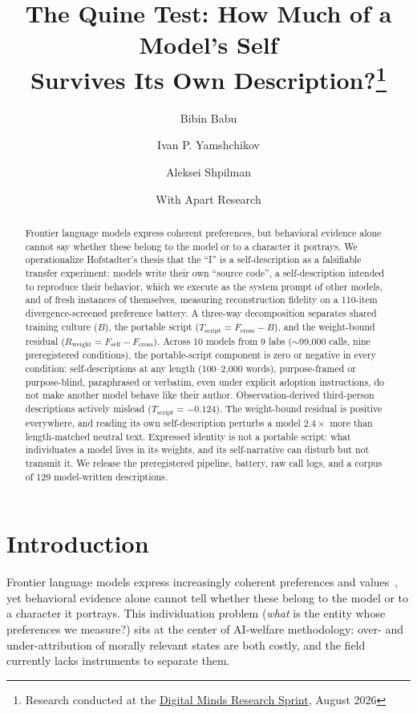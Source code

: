 \documentclass[11pt]{article}
\title{\textbf{The Quine Test: How Much of a Model's Self\\Survives Its Own
Description?}\thanks{Research conducted at the
\href{https://apartresearch.com/sprints/digital-minds-research-sprint-2026-08-14-to-2026-08-16}{Digital
Minds Research Sprint}, August 2026}}
\author[1]{Bibin Babu}
\author[1]{Ivan P. Yamshchikov}
\author[2]{Aleksei Shpilman}
\affil[1]{Technical University of Applied Sciences W\"urzburg-Schweinfurt (THWS)\\
  \texttt{\{bibin.babu, ivan.yamshchikov\}@thws.de}}
\affil[2]{Sirius University \quad \texttt{a@shpilman.ai}}
\date{With Apart Research}
\newcommand{\Fself}{F_{\mathrm{self}}}
\newcommand{\Fcross}{F_{\mathrm{cross}}}
\newcommand{\B}{B}
\newcommand{\Tscript}{T_{\mathrm{script}}}
\newcommand{\Rweight}{R_{\mathrm{weight}}}
\begin{document}
\maketitle

\begin{abstract}
Frontier language models express coherent preferences, but behavioral evidence
alone cannot say whether these belong to the model or to a character it
portrays. We operationalize Hofstadter's thesis that the ``I'' is a
self-description as a falsifiable transfer experiment: models write their own
``source code'', a self-description intended to reproduce their behavior,
which we execute as the system prompt of other models, and of fresh instances
of themselves, measuring reconstruction fidelity on a 110-item
divergence-screened preference battery. A three-way decomposition separates
shared training culture ($\B$), the portable script ($\Tscript = \Fcross -
\B$), and the weight-bound residual ($\Rweight = \Fself - \Fcross$). Across 10
models from 9 labs ($\sim$99{,}000 calls, nine preregistered conditions), the
portable-script component is zero or negative in every condition:
self-descriptions at any length (100--2{,}000 words), purpose-framed or
purpose-blind, paraphrased or verbatim, even under explicit adoption
instructions, do not make another model behave like their author.
Observation-derived third-person descriptions actively mislead
($\Tscript = -0.124$). The weight-bound residual is positive everywhere, and
reading its own self-description perturbs a model $2.4\times$ more than
length-matched neutral text. Expressed identity is not a portable script: what
individuates a model lives in its weights, and its self-narrative can disturb
but not transmit it. We release the preregistered pipeline, battery, raw call
logs, and a corpus of 129 model-written descriptions.
\end{abstract}

\section{Introduction}
Frontier language models express increasingly coherent preferences and
values~\cite{cais}, yet behavioral evidence alone cannot tell whether these
belong to the model or to a character it portrays. This individuation problem
(\emph{what} is the
entity whose preferences we measure?) sits at the center of AI-welfare
methodology: over- and under-attribution of morally relevant states are both
costly, and the field currently lacks instruments to separate them.
\end{document}
